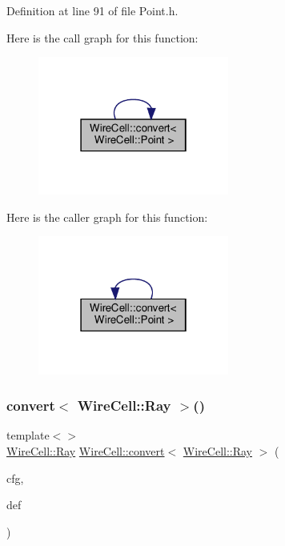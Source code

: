 Definition at line 91 of file Point.\+h.

Here is the call graph for this function\+:
\nopagebreak
\begin{figure}[H]
\begin{center}
\leavevmode
\includegraphics[width=178pt]{namespace_wire_cell_a936eba17fa684570591e0ed12dc4219a_cgraph}
\end{center}
\end{figure}
Here is the caller graph for this function\+:
\nopagebreak
\begin{figure}[H]
\begin{center}
\leavevmode
\includegraphics[width=178pt]{namespace_wire_cell_a936eba17fa684570591e0ed12dc4219a_icgraph}
\end{center}
\end{figure}
\mbox{\label{namespace_wire_cell_a377a84d938ffcb68212b7119171e008d}} 
\subsubsection{\texorpdfstring{convert$<$ Wire\+Cell\+::\+Ray $>$()}{convert< WireCell::Ray >()}}
{\footnotesize\ttfamily template$<$$>$ \\
\hyperlink{namespace_wire_cell_a3ab20d9b438feb7eb1ffaab9ba98af0c}{Wire\+Cell\+::\+Ray} \hyperlink{namespace_wire_cell_a5f6648d6ae801b20a17b8a35fd3306e5}{Wire\+Cell\+::convert}$<$ \hyperlink{namespace_wire_cell_a3ab20d9b438feb7eb1ffaab9ba98af0c}{Wire\+Cell\+::\+Ray} $>$ (\begin{DoxyParamCaption}\item[{const \hyperlink{namespace_wire_cell_a9f705541fc1d46c608b3d32c182333ee}{Configuration} \&}]{cfg,  }\item[{const \hyperlink{namespace_wire_cell_a3ab20d9b438feb7eb1ffaab9ba98af0c}{Wire\+Cell\+::\+Ray} \&}]{def }\end{DoxyParamCaption})\hspace{0.3cm}{\ttfamily [inline]}}



